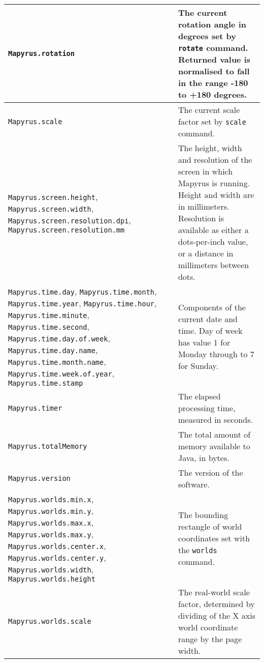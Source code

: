 \begin{longtable}{|p{6cm}|p{7cm}|}
\hline

\texttt{Mapyrus.rotation} &
The current rotation angle in degrees set by
\texttt{rotate} command.
Returned value is normalised to fall in the
range -180 to +180 degrees. \\

\hline

\texttt{Mapyrus.scale} &
The current scale factor set by \texttt{scale} command. \\

\hline

\texttt{Mapyrus.screen.height},
\texttt{Mapyrus.screen.width},
\texttt{Mapyrus.screen.resolution.dpi},
\texttt{Mapyrus.screen.resolution.mm} &
The height, width and resolution of the screen in which Mapyrus
is running.
Height and width are in millimeters.  Resolution is available
as either a dots-per-inch value, or a distance in millimeters between
dots. \\

\hline

\texttt{Mapyrus.time.day},
\texttt{Mapyrus.time.month},
\texttt{Mapyrus.time.year},
\texttt{Mapyrus.time.hour},
\texttt{Mapyrus.time.minute},
\texttt{Mapyrus.time.second},
\texttt{Mapyrus.time.day.of.week},
\texttt{Mapyrus.time.day.name},
\texttt{Mapyrus.time.month.name},
\texttt{Mapyrus.time.week.of.year},
\texttt{Mapyrus.time.stamp}
&
Components of the current date and time.
Day of week has value 1 for Monday through to 7 for Sunday.

\\

\hline

\texttt{Mapyrus.timer} &
The elapsed processing time, measured in seconds. \\

\hline

\texttt{Mapyrus.totalMemory} &
The total amount of memory available to Java, in bytes. \\

\hline

\texttt{Mapyrus.version} &
The version of the software. \\

\hline

\texttt{Mapyrus.worlds.min.x},
\texttt{Mapyrus.worlds.min.y},
\texttt{Mapyrus.worlds.max.x},
\texttt{Mapyrus.worlds.max.y},
\texttt{Mapyrus.worlds.center.x},
\texttt{Mapyrus.worlds.center.y},
\texttt{Mapyrus.worlds.width},
\texttt{Mapyrus.worlds.height} &
The bounding rectangle of world coordinates set with the 
\texttt{worlds} command. \\

\hline

\texttt{Mapyrus.worlds.scale} &
The real-world scale factor, determined by
dividing of the X axis world coordinate range
by the page width. \\

\end{longtable}


